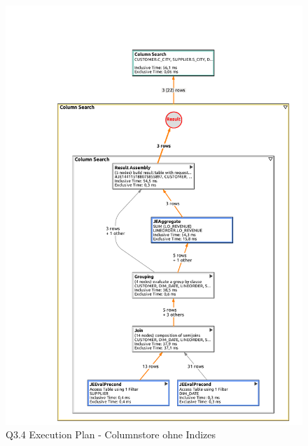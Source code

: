 \begin{figure}[H]
	\centering
	\includegraphics[width=\textwidth]{images/col_q34_no.pdf}
	\caption{Q3.4 Execution Plan - Columnstore ohne Indizes}\label{exec:q3.4-col-no}
\end{figure}

